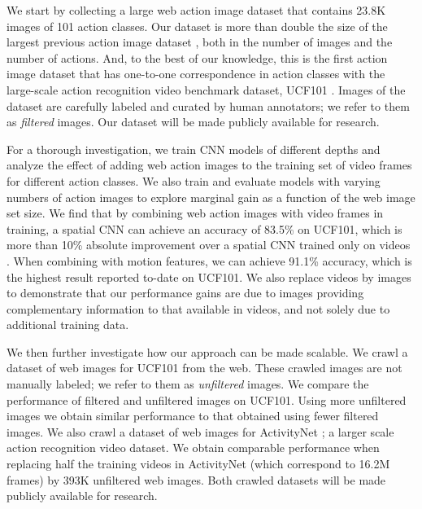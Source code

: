 \documentclass[10pt,twocolumn,letterpaper]{article}
\begin{document}
We start by collecting a large web action image dataset that contains 23.8K images of 101 action classes. Our dataset is more than double the size of the largest previous action image dataset \cite{yao2011human}, both in the number of images and the number of actions. And, to the best of our knowledge, this is the first action image dataset that has one-to-one correspondence in action classes with the large-scale action recognition video benchmark dataset, UCF101 \cite{ucf101}. Images of the dataset are carefully labeled and curated by human annotators; we refer to them as {\em filtered} images. Our dataset will be made publicly available for research.

For a thorough investigation, we train CNN models of different depths and analyze the effect of adding web action images to the training set of video frames for different action classes. We also train and evaluate models with varying numbers of action images to explore marginal gain as a function of the web image set size. We find that by combining web action images with video frames in training, a spatial CNN can achieve an accuracy of 83.5\% on UCF101, which is more than 10\% absolute improvement over a spatial CNN trained only on videos \cite{simonyan2014two}. When combining with motion features, we can achieve 91.1\% accuracy, which is the highest result reported to-date on UCF101. We also replace videos by images to demonstrate that our performance gains are due to images providing complementary information to that available in videos, and not solely due to additional training data.

We then further investigate how our approach can be made scalable. We crawl a dataset of web images for UCF101 from the web. These crawled images are not manually labeled; we refer to them as {\em unfiltered} images. We compare the performance of filtered and unfiltered images on UCF101. Using more unfiltered images we obtain similar performance to that obtained using fewer filtered images. We also crawl a dataset of web images for ActivityNet \cite{caba2015activitynet}; a larger scale action recognition video dataset. We obtain comparable performance when replacing half the training videos in ActivityNet (which correspond to 16.2M frames) by 393K unfiltered web images. Both crawled datasets will be made publicly available for research.
\end{document}

